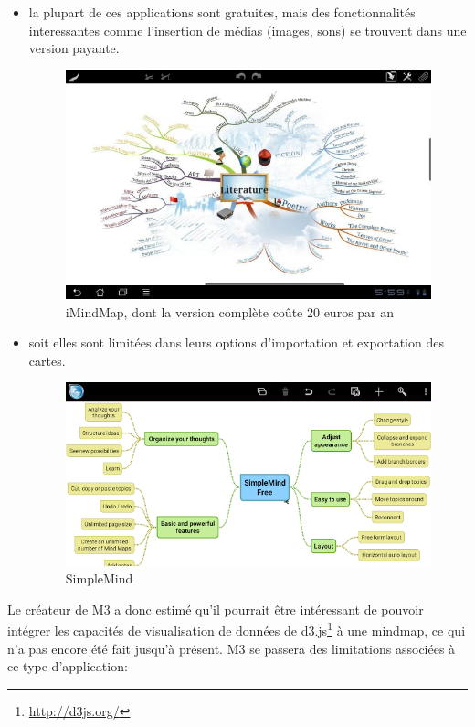 \documentclass[11pt,a4paper,margin=0.5in]{report}
\begin{document}
\begin{itemize}
\item{la plupart de ces applications sont gratuites, mais des fonctionnalités interessantes comme l'insertion
de médias (images, sons) se trouvent dans une version payante.}

\begin{figure}[!ht]
  \caption{iMindMap, dont la version complète coûte 20 euros par an}
  \centering
    \includegraphics[width=1\textwidth]{ex1.jpg}
\end{figure}

\item{soit elles sont limitées dans leurs options d'importation et exportation des cartes.}

\begin{figure}[!ht]
  \caption{SimpleMind}
  \centering
    \includegraphics[width=1\textwidth]{unnamed.png}
\end{figure}

\end{itemize}

\clearpage

Le créateur de M3 a donc estimé qu'il pourrait être intéressant de pouvoir intégrer les capacités de visualisation de données de d3.js\footnote{\url{http://d3js.org/}} à une mindmap, ce qui n'a pas encore été fait jusqu'à présent.
M3 se passera des limitations associées à ce type d'application:
\end{document}
